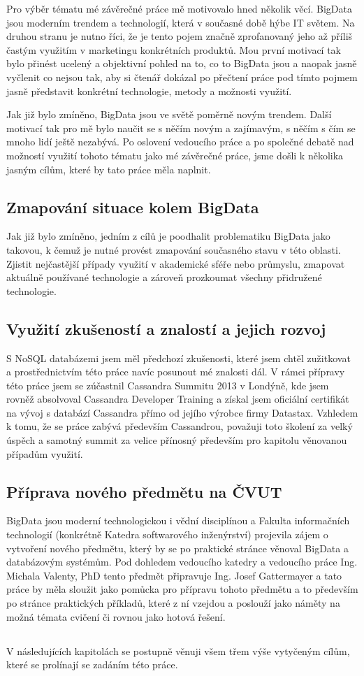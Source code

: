 Pro výběr tématu mé závěrečné práce mě motivovalo hned několik věcí. BigData jsou moderním trendem a technologií, která v současné době hýbe IT světem. Na druhou stranu je nutno říci, že je tento pojem značně zprofanovaný jeho až příliš častým využitím v marketingu konkrétních produktů. Mou první motivací tak bylo přinést ucelený a objektivní pohled na to, co to BigData jsou a naopak jasně vyčlenit co nejsou tak, aby si čtenář dokázal po přečtení práce pod tímto pojmem jasně představit konkrétní technologie, metody a možnosti využití. 

Jak již bylo zmíněno, BigData jsou ve světě poměrně novým trendem. Další motivací tak pro mě bylo naučit se s něčím novým a zajímavým, s něčím s čím se mnoho lidí ještě nezabývá. Po oslovení vedoucího práce a po společné debatě nad možností využití tohoto tématu jako mé závěrečné práce, jsme došli k několika jasným cílům, které by tato práce měla naplnit. 

\subsection{Zmapování situace kolem BigData}
Jak již bylo zmíněno, jedním z cílů je poodhalit problematiku BigData jako takovou, k čemuž je nutné provést zmapování současného stavu v této oblasti. Zjistit nejčastější případy využití v akademické sféře nebo průmyslu, zmapovat aktuálně používané technologie a zároveň prozkoumat všechny přidružené technologie. 

\subsection{Využití zkušeností a znalostí a jejich rozvoj}
S NoSQL databázemi jsem měl předchozí zkušenosti, které jsem chtěl zužitkovat a prostřednictvím této práce navíc posunout mé znalosti dál. V rámci přípravy této práce jsem se zúčastnil Cassandra Summitu 2013 v Londýně, kde jsem rovněž absolvoval Cassandra Developer Training a získal jsem oficiální certifikát na vývoj s databází Cassandra přímo od jejího výrobce firmy Datastax. Vzhledem k tomu, že se práce zabývá především Cassandrou, považuji toto školení za velký úspěch a samotný summit za velice přínosný především pro kapitolu věnovanou případům využití.

\subsection{Příprava nového předmětu na ČVUT}
BigData jsou moderní technologickou i vědní disciplínou a Fakulta informačních technologií (konkrétně Katedra softwarového inženýrství) projevila zájem o vytvoření nového předmětu, který by se po praktické stránce věnoval BigData a databázovým systémům. Pod dohledem vedoucího katedry a vedoucího práce Ing. Michala Valenty, PhD tento předmět připravuje Ing. Josef Gattermayer a tato práce by měla sloužit jako pomůcka pro přípravu tohoto předmětu a to především po stránce praktických příkladů, které z ní vzejdou a poslouží jako náměty na možná témata cvičení či rovnou jako hotová řešení. 

\subsection{}
V následujících kapitolách se postupně věnuji všem třem výše vytyčeným cílům, které se prolínají se zadáním této práce. 

